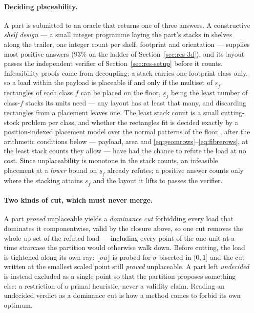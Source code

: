 \paragraph{Deciding placeability.}
A part is submitted to an oracle that returns one of three answers. A
constructive \emph{shelf design} --- a small integer programme laying
the part's stacks in shelves along the trailer, one integer count per
shelf, footprint and orientation --- supplies most positive answers
($93\%$ on the ladder of Section~\ref{sec:res-3d}), and its layout passes the independent verifier of
Section~\ref{sec:res-setup} before it counts. Infeasibility proofs
come from decoupling: a stack carries one footprint class only, so a load within the payload is placeable if and
only if the multiset of $\underline{s}_{f}$ rectangles of each class $f$ can be
placed on the floor, $\underline{s}_{f}$ being the least number of
class-$f$ stacks its units need --- any layout has at least that many,
and discarding rectangles from a placement leaves one. The least
stack count is a small cutting-stock problem per class, and whether the
rectangles fit is decided exactly by a position-indexed placement model
over the normal patterns of the floor
\autocite{ChristofidesWhitlock1977,Beasley1985}, after the arithmetic
conditions below --- payload, area and
\eqref{eq:geomrows}--\eqref{eq:fibrerows}, at the least stack counts
they allow --- have had the chance to refute the load at no cost. Since unplaceability is
monotone in the stack counts, an infeasible placement at a \emph{lower}
bound on $\underline{s}_{f}$ already refutes; a positive answer counts
only where the stacking attains $\underline{s}_{f}$ and the layout it
lifts to passes the verifier.

\paragraph{Two kinds of cut, which must never merge.}
A part \emph{proved} unplaceable yields a \emph{dominance cut}
forbidding every load that dominates it componentwise, valid by the
closure above, so one cut removes the whole up-set of the refuted load
--- including every point of the one-unit-at-a-time staircase the
partition would otherwise walk down. Before cutting, the load is
tightened along its own ray: $\lfloor\sigma a\rfloor$ is probed for
$\sigma$ bisected in $(0,1]$ and the cut written at the smallest scaled
point still \emph{proved} unplaceable. A part left \emph{undecided} is
instead excluded as a single point so that the partition proposes
something else: a restriction of a primal heuristic, never a validity
claim. Reading an undecided verdict as a dominance cut is how a method
comes to forbid its own optimum.

